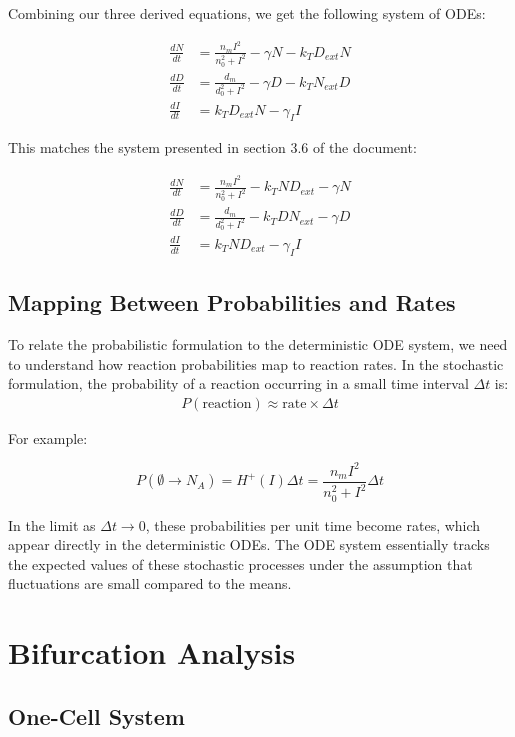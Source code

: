 \documentclass{article}
\begin{document}
\begin{flushleft}
Combining our three derived equations, we get the following system of ODEs:

\begin{align*}
\frac{dN}{dt} &= \frac{n_m I^2}{n_0^2 + I^2} - \gamma N - k_T D_{ext} N \\
\frac{dD}{dt} &= \frac{d_m}{d_0^2 + I^2} - \gamma D - k_T N_{ext} D \\
\frac{dI}{dt} &= k_T D_{ext} N - \gamma_I I
\end{align*}

This matches the system presented in section 3.6 of the document:

\begin{align*}
\frac{dN}{dt} &= \frac{n_m I^2}{n_0^2 + I^2} - k_T N D_{ext} - \gamma N \\
\frac{dD}{dt} &= \frac{d_m}{d_0^2 + I^2} - k_T D N_{ext} - \gamma D \\
\frac{dI}{dt} &= k_T N D_{ext} - \gamma_I I
\end{align*}

\subsection*{Mapping Between Probabilities and Rates}

To relate the probabilistic formulation to the deterministic ODE system, we need to understand how reaction probabilities map to reaction rates. In the stochastic formulation, the probability of a reaction occurring in a small time interval $\Delta t$ is:
\begin{align*}
P(\text{reaction}) \approx \text{rate} \times \Delta t
\end{align*}

For example:

\[
P(\emptyset \rightarrow N_A) = H^+(I) \Delta t = \frac{n_m I^2}{n_0^2 + I^2} \Delta t 
\]

In the limit as $\Delta t \rightarrow 0$, these probabilities per unit time become rates, which appear directly in the deterministic ODEs. The ODE system essentially tracks the expected values of these stochastic processes under the assumption that fluctuations are small compared to the means.

\section{Bifurcation Analysis}
\label{sec:bifurcation}

\subsection*{One-Cell System}


\end{flushleft}
\end{document}
